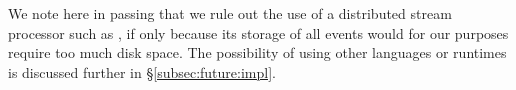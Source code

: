 We note here in passing that we rule out the use of a distributed
stream processor such
as , if only
because its storage of all events would for our purposes require too
much disk space.  The possibility of using other languages or runtimes
is discussed further in \S\ref{subsec:future:impl}.
